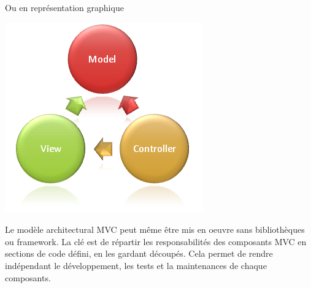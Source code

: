 Ou en représentation graphique

\begin{center}
\includegraphics[scale=0.6]{img/mvc.png}
\label{L'architecture MVC}
\end{center}


Le modèle architectural MVC peut même être mis en oeuvre sans bibliothèques ou framework. La clé est de répartir les responsabilités des composants MVC en sections de code défini, en les gardant découpés. Cela permet de rendre indépendant le développement, les tests et la maintenances de chaque composants.



